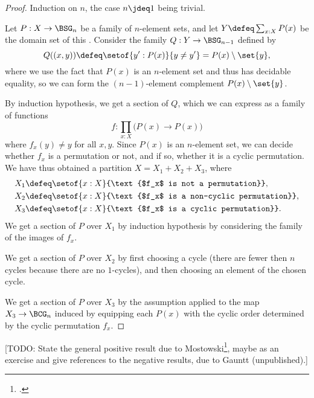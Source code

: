 \begin{proof}
  Induction on $n$, the case $n\jdeq 1$ being trivial.

  Let $P : X \to \BSG_n$ be a family of $n$-element sets,
  and let $Y \defeq \sum_{x:X}P(x)$ be the domain set of this \covering.
  Consider the family $Q : Y \to \BSG_{n-1}$ defined by
  \[
    Q((x,y)) \defeq \setof{y' : P(x)}{y \ne y'} = P(x) \setminus \set{y},
  \]
  where we use the fact that $P(x)$ is an $n$-element set
  and thus has decidable equality,
  so we can form the $(n-1)$-element complement $P(x) \setminus
  \set{y}$.

  By induction hypothesis, we get a section of $Q$, which we can
  express as a family of functions
  \[
    f : \prod_{x:X}\bigl(P(x) \to P(x)\bigr)
  \]
  where $f_x(y) \ne y$ for all $x,y$.
  Since $P(x)$ is an $n$-element set, we can decide whether $f_x$
  is a permutation or not, and if so, whether it is a cyclic
  permutation.
  We have thus obtained a partition $X = X_1 + X_2 + X_3$,
  where
  \begin{align*}
    X_1 &\defeq \setof{x:X}{\text{$f_x$ is not a permutation}}, \\
    X_2 &\defeq \setof{x:X}{\text{$f_x$ is a non-cyclic permutation}}, \\
    X_3 &\defeq \setof{x:X}{\text{$f_x$ is a cyclic permutation}}.
  \end{align*}
  We get a section of $P$ over $X_1$ by induction hypothesis
  by considering the family of the images of $f_x$.

  We get a section of $P$ over $X_2$ by first choosing a cycle
  (there are fewer then $n$ cycles because there are no $1$-cycles),
  and then choosing an element of the chosen cycle.

  We get a section of $P$ over $X_3$ by the assumption applied
  to the map $X_3 \to \BCG_n$ induced by equipping each $P(x)$ with
  the cyclic order determined by the cyclic permutation $f_x$.
\end{proof}

[TODO: State the general positive result due to
Mostowski\footcite{Mostowski-Finite-Choice}, maybe as an exercise
and give references to the negative results, due to Gauntt (unpublished).]

